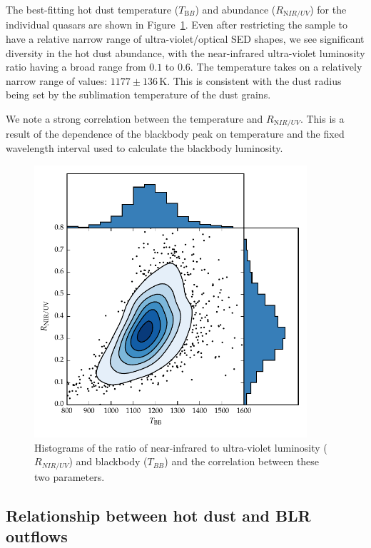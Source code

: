 The best-fitting hot dust temperature ($T_{\mathrm BB}$) and abundance ($R_{\mathrm NIR/UV}$) for the individual quasars are shown in Figure~\ref{fig:ratio_tbb_density}.
Even after restricting the sample to have a relative narrow range of ultra-violet/optical SED shapes, we see significant diversity in the hot dust abundance, with the near-infrared ultra-violet luminosity ratio having a broad range from $0.1$ to $0.6$.
The temperature takes on a relatively narrow range of values: $1177\pm136$\,K. 
This is consistent with the dust radius being set by the sublimation temperature of the dust grains. 

We note a strong correlation between the temperature and $R_{\mathrm NIR/UV}$. 
This is a result of the dependence of the blackbody peak on temperature and the fixed wavelength interval used to calculate the blackbody luminosity. 

\begin{figure}[t!]
  \centering
  \includegraphics[width=0.9\textwidth]{figures/chapter05/ratio_tbb_density.pdf}
  \caption[{Ratio of near-infrared to ultra-violet luminosity ($R_{NIR/UV}$) against temperature ($T_{BB}$) for low-$z$ sample.}]{Histograms of the ratio of near-infrared to ultra-violet luminosity ($R_{NIR/UV}$) and blackbody ($T_{BB}$) and the correlation between these two parameters. }
  \label{fig:ratio_tbb_density}
\end{figure}

\subsection{Relationship between hot dust and BLR outflows}

